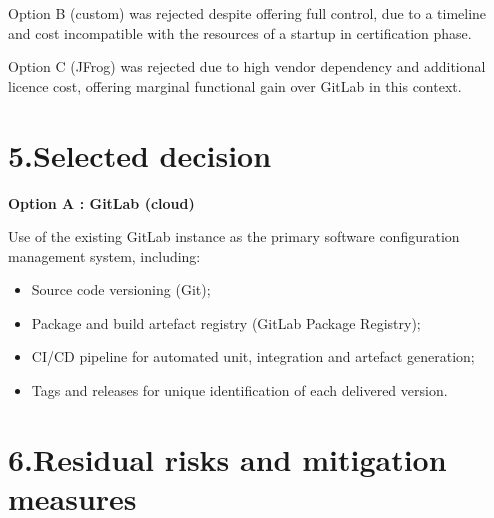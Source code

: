 Option B (custom) was rejected despite offering full control, due to a timeline and cost incompatible with the resources of a startup in certification phase.

Option C (JFrog) was rejected due to high vendor dependency and additional licence cost, offering marginal functional gain over GitLab in this context.

\section*{5.\quad Selected decision}

\begin{decisionbox}
\textbf{Option A : GitLab (cloud)}

Use of the existing GitLab instance as the primary software configuration management system, including:

\begin{itemize}
  \item Source code versioning (Git);
  \item Package and build artefact registry (GitLab Package Registry);
  \item CI/CD pipeline for automated unit, integration and artefact generation;
  \item Tags and releases for unique identification of each delivered version.
\end{itemize}
\end{decisionbox}

\section*{6.\quad Residual risks and mitigation measures}

